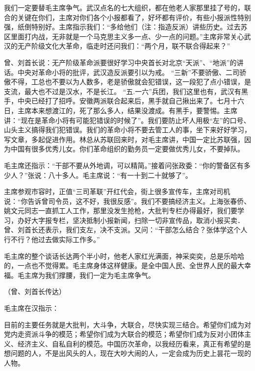 我们一定要替毛主席争气。武汉点名的七大组织，都在他老人家那里挂了号的，联合的关键在你们，主席对你们各个小报都看了，好坏都有评价，有些小报派性特别强，纸倒特别好。主席指示我们：“多给他们（注：指造反派）讲些历史。过去苏区里面打内战，无非就是一个马克思主义多一点、少一点的问题。”主席非常关心武汉的无产阶级文化大革命，临走时还问我们：“两个月，联不联合得起来？”

曾、刘首长说：无产阶级革命派要很好学习中央首长对北京“天派”、“地派”的讲话。中央对革命小将的批评，武汉造反派要引以为戒。  “三新”不要骄傲、二司骄傲不得，工总也不要以为人数多，老是骄傲就会犯错误，这一段犯了点小错误，是支流，最大也不过是汉水，不是长江。 “五.一六”兵团，我们这里也有，武汉有黑手，中央已经打了招呼。安徽两派联合起来后，黑手就自己揪出来了。七月十六日，主席本来想渡江的，死了那么多人，结果没渡成。有黑手，要警惕。主席讲：“现在是革命小将有可能犯错误的时候了”。我们要防止坏人用极“左”的口号、山头主义搞得我们犯错误。我们的革命小将不要去管工人的事，坐下来好好学习，写文章，多起促进作用。林总从苏联回来时，对毛主席讲，中国一定比苏联强，因为中国有很多优秀儿女。你们革命组织的勤务员一定要做优秀儿女，不要掉队。

毛主席还指示：“干部不要从外地调，可以精简。”接着问张政委：“你的警备区有多少人？”张说：八十多人。毛主席说：“有一十到二十就够了”。

主席参观市容时，正值“三司革联”开红代会，街上很多宣传车，主席对司机说：“你告诉曾司令员，这不好，我很反感”。我们不要搞经济主义。上海张春侨、姚文元同志一直抓工人工作，那里没发生抢枪，大批判专栏办得最好，我们要学习，办好大字报专栏，坚决抵制小报新闻，扫除一切非宣传品，取消小报买卖．曾、刘首长还表示，我们支左，决不支派。又问：“干部怎么结合？张体学这个人行不行？他过去做实际工作多。”

毛主席的整个谈话长达两个半小时，他老人家红光满面，神采奕奕，总是乐哈哈的，一点也不觉得累。毛主席身体这样健康。是全中国人民、全世界人民的最大幸福。毛主席为我们撑腰，我们一定为毛主席争气。

（曾、刘首长传达）

毛主席在汉指示：

目前的主要任务就是大批判，大斗争，大联合，尽快实现三结合。希望你们成为对党内走资派斗争的模范；希望你们成为大联合的模范；希望你们成为反对小团体主义、经济主义、自私自利的模范。中国历次革命，以我经历看来，真正有希望的是想问题的人，不是出风头的人，现在大吵大闹的人，一定会成为历史上昙花一现的人物。

